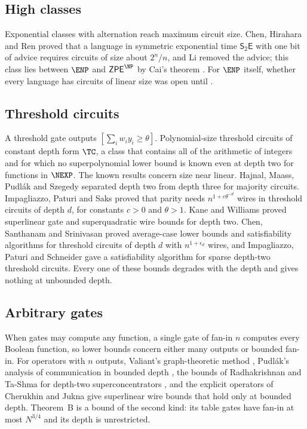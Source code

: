 \subsection{High classes}
Exponential classes with alternation reach maximum circuit size. Chen,
Hirahara and Ren \cite{CHR24} proved that a language in symmetric exponential
time $\mathsf{S_2E}$ with one bit of advice requires circuits of size about
$2^n/n$, and Li \cite{Li24} removed the advice; this class lies between
$\ENP$ and $\mathsf{ZPE}^{\NP}$ by Cai's theorem \cite{Cai07}. For $\ENP$
itself, whether every language has circuits of linear size was open until
\cite[Corollary C.1]{OAI26}.

\subsection{Threshold circuits}
A threshold gate outputs $[\sum_iw_iy_i\ge\theta]$. Polynomial-size threshold
circuits of constant depth form $\TC$, a class that contains all of the
arithmetic of integers and for which no superpolynomial lower bound is known
even at depth two for functions in $\NEXP$. The known results concern size near
linear. Hajnal, Maass, Pudl\'ak and Szegedy \cite{HMPST93} separated depth two
from depth three for majority circuits. Impagliazzo, Paturi and Saks
\cite{IPS97} proved that parity needs $n^{1+c\theta^{-d}}$ wires in threshold
circuits of depth $d$, for constants $c>0$ and $\theta>1$. Kane and Williams
\cite{KW16} proved superlinear gate and superquadratic wire bounds for depth
two. Chen, Santhanam and Srinivasan \cite{CSS18} proved average-case lower
bounds and satisfiability algorithms for threshold circuits of depth $d$ with
$n^{1+\epsilon_d}$ wires, and Impagliazzo, Paturi and Schneider \cite{IPS13}
gave a satisfiability algorithm for sparse depth-two threshold circuits.
Every one of these bounds degrades with the depth and gives nothing at
unbounded depth.

\subsection{Arbitrary gates}
When gates may compute any function, a single gate of fan-in $n$ computes every
Boolean function, so lower bounds concern either many outputs or bounded fan-in.
For operators with $n$ outputs, Valiant's graph-theoretic method \cite{Val77},
Pudl\'ak's analysis of communication in bounded depth \cite{Pud94}, the bounds
of Radhakrishnan and Ta-Shma for depth-two superconcentrators \cite{RTS00}, and
the explicit operators of Cherukhin \cite{Che11} and Jukna \cite{Juk10} give
superlinear wire bounds that hold only at bounded depth. Theorem~B is a bound of
the second kind: its table gates have fan-in at most $N^{3/4}$ and its depth is
unrestricted.

